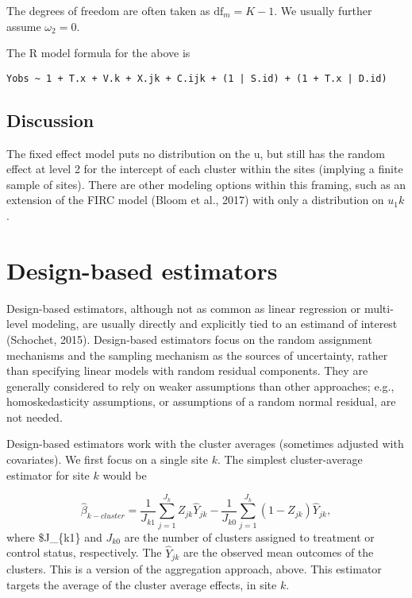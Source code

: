 \documentclass[]{article}
\begin{document}
The degrees of freedom are often taken as $\text{df}_m = K - 1$. We
usually further assume $\omega_{2} = 0$.

The R model formula for the above is

\begin{verbatim}
Yobs ~ 1 + T.x + V.k + X.jk + C.ijk + (1 | S.id) + (1 + T.x | D.id)
\end{verbatim}

\subsection{Discussion}\label{discussion}

The fixed effect model puts no distribution on the u, but still has the
random effect at level 2 for the intercept of each cluster within the
sites (implying a finite sample of sites). There are other modeling
options within this framing, such as an extension of the FIRC model
(Bloom et al., 2017) with only a distribution on $u_1k$.






\section{Design-based estimators}\label{design-based-estimators}

Design-based estimators, although not as common as linear regression or
multi-level modeling, are usually directly and explicitly tied to an
estimand of interest (Schochet, 2015). Design-based estimators focus on
the random assignment mechanisms and the sampling mechanism as the
sources of uncertainty, rather than specifying linear models with random
residual components. They are generally considered to rely on weaker
assumptions than other approaches; e.g., homoskedasticity assumptions,
or assumptions of a random normal residual, are not needed.

Design-based estimators work with the cluster averages (sometimes
adjusted with covariates). We first focus on a single site $k$.
The simplest cluster-average estimator for site $k$ would be

\[
\hat{\beta}_{k-cluster} = \frac{1}{J_{k1}}  \sum_{j=1}^{J_k} Z_{jk} \hat{Y}_{jk} - \frac{1}{J_{k0}} \sum_{j=1}^{J_k} (1-Z_{jk}) \hat{Y}_{jk} ,
\]
where \$J\_\{k1\} and $J_{k0}$ are the number of clusters assigned to treatment or control status, respectively.
The $\hat{Y}_{jk}$ are the observed mean outcomes of the clusters.
This is a version of the
aggregation approach, above.
This estimator targets the average of the cluster average effects, in
site $k$.
\end{document}
